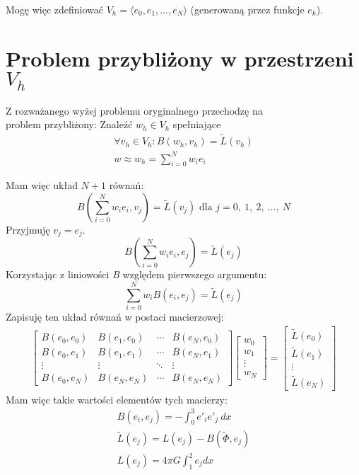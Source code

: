 \documentclass{article}
\begin{document}
\noindent
Mogę więc zdefiniować \(V_h = \langle e_0, e_1, \ldots, e_N \rangle\) (generowaną przez funkcje \(e_k\)).

\section{Problem przybliżony w przestrzeni \(V_h\)}

Z rozważanego wyżej problemu oryginalnego przechodzę na\\
problem przybliżony: Znaleźć \(w_h \in V_h\) spełniające
\begin{gather*}
    \forall v_h \in V_h : B(w_h, v_h) = \tilde{L}(v_h)\\
    w \approx w_h = \sum_{i=0}^N w_i e_i
\end{gather*}

\noindent
Mam więc układ \(N+1\) równań:
\[B \left(\sum_{i=0}^N w_i e_i, v_j \right) = \tilde{L}(v_j) \text{ dla } j = 0,\ 1,\ 2,\ \ldots,\ N\]
Przyjmuję \(v_j = e_j\).
\[B \left(\sum_{i=0}^N w_i e_i, e_j \right) = \tilde{L}(e_j)\]
Korzystając z liniowości \textit{B} względem pierwszego argumentu:
\[\sum_{i=0}^N w_i B(e_i, e_j) = \tilde{L}(e_j)\]
Zapisuję ten układ równań w postaci macierzowej:
\begin{gather*}
    \begin{bmatrix}
        B(e_0, e_0) & B(e_1, e_0) & \cdots & B(e_N, e_0)\\
        B(e_0, e_1) & B(e_1, e_1) & \cdots & B(e_N, e_1)\\
        \vdots & \vdots & \ddots & \vdots\\
        B(e_0, e_N) & B(e_N, e_N) & \cdots & B(e_N, e_N)
    \end{bmatrix}
    \begin{bmatrix}
        w_0 \\ w_1 \\ \vdots \\ w_N
    \end{bmatrix}
    =
    \begin{bmatrix}
        \tilde{L}(e_0) \\ \tilde{L}(e_1) \\ \vdots \\ \tilde{L}(e_N)
    \end{bmatrix}
\end{gather*}
\noindent
Mam więc takie wartości elementów tych macierzy:
\begin{gather*}
    B(e_i, e_j) = -\int_0^3 e'_i e'_j\ dx\\
    \tilde{L}(e_j) = L(e_j) - B(\tilde{\Phi}, e_j)\\
    L(e_j) = 4 \pi G \int_1^2 e_j dx
\end{gather*}
\end{document}

